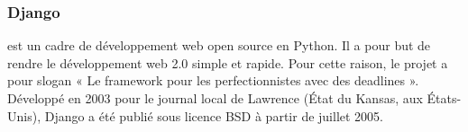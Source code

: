 \subsubsection{Django}
est un cadre de développement web open source en Python. Il a pour
but de rendre le développement web 2.0 simple et rapide. Pour cette raison, le
projet a pour slogan « Le framework pour les perfectionnistes avec des
deadlines ». Développé en 2003 pour le journal local de Lawrence (État du
Kansas, aux États-Unis), Django a été publié sous licence BSD à partir de
juillet 2005.